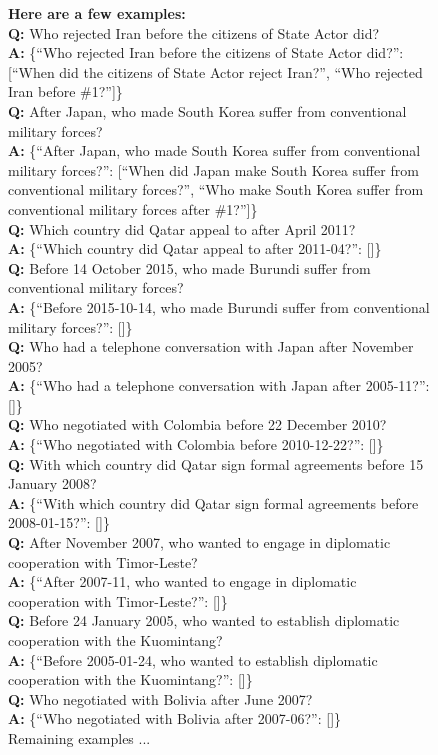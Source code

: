 \documentclass[11pt]{article}
\begin{document}
\begin{figure}[!h]
\begin{tcolorbox}
{\vspace{0.5em}
\textbf{Here are a few examples:}\\[1em]
\textbf{Q:} Who rejected Iran before the citizens of State Actor did? \\
\textbf{A:} \{``Who rejected Iran before the citizens of State Actor did?'': [``When did the citizens of State Actor reject Iran?'', ``Who rejected Iran before \#1?'']\} \\[0.5em]
\textbf{Q:} After Japan, who made South Korea suffer from conventional military forces? \\
\textbf{A:} \{``After Japan, who made South Korea suffer from conventional military forces?'': [``When did Japan make South Korea suffer from conventional military forces?'', ``Who make South Korea suffer from conventional military forces after \#1?'']\} \\[0.5em]
\textbf{Q:} Which country did Qatar appeal to after April 2011? \\
\textbf{A:} \{``Which country did Qatar appeal to after 2011-04?'': []\} \\[0.5em]
\textbf{Q:} Before 14 October 2015, who made Burundi suffer from conventional military forces? \\
\textbf{A:} \{``Before 2015-10-14, who made Burundi suffer from conventional military forces?'': []\} \\[0.5em]
\textbf{Q:} Who had a telephone conversation with Japan after November 2005? \\
\textbf{A:} \{``Who had a telephone conversation with Japan after 2005-11?'': []\} \\[0.5em]
\textbf{Q:} Who negotiated with Colombia before 22 December 2010? \\
\textbf{A:} \{``Who negotiated with Colombia before 2010-12-22?'': []\} \\[0.5em]
\textbf{Q:} With which country did Qatar sign formal agreements before 15 January 2008? \\
\textbf{A:} \{``With which country did Qatar sign formal agreements before 2008-01-15?'': []\} \\[0.5em]
\textbf{Q:} After November 2007, who wanted to engage in diplomatic cooperation with Timor-Leste? \\
\textbf{A:} \{``After 2007-11, who wanted to engage in diplomatic cooperation with Timor-Leste?'': []\} \\[0.5em]
\textbf{Q:} Before 24 January 2005, who wanted to establish diplomatic cooperation with the Kuomintang? \\
\textbf{A:} \{``Before 2005-01-24, who wanted to establish diplomatic cooperation with the Kuomintang?'': []\} \\[0.5em]
\textbf{Q:} Who negotiated with Bolivia after June 2007? \\
\textbf{A:} \{``Who negotiated with Bolivia after 2007-06?'': []\} \\[0.5em]
Remaining examples ...
\vspace{0.5em}

}
\end{tcolorbox}
\end{figure}
\end{document}
